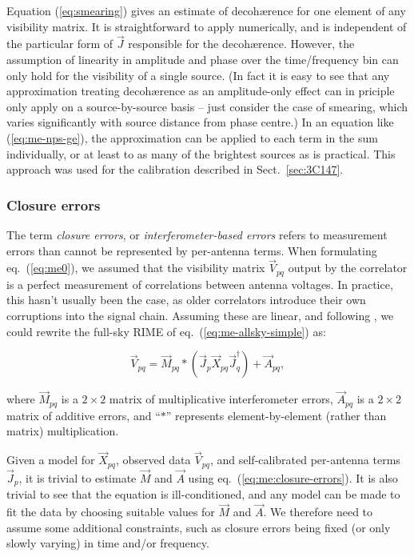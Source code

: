 \documentclass[]{aa}
\begin{document}
Equation (\ref{eq:smearing}) gives an estimate of decoh{\ae}rence for one element of any visibility matrix. It is straightforward to apply numerically, and is independent of the particular form of $\vec J$ responsible for the decoh{\ae}rence. However, the assumption of linearity in amplitude and phase 
over the time/frequency bin can only hold for the visibility of a single source. (In fact it is easy to see that any approximation treating decoh{\ae}rence as an amplitude-only effect can in priciple only apply on a source-by-source basis -- just consider the case of smearing, which varies significantly with source distance from phase centre.) In an equation like (\ref{eq:me-nps-ge}), the approximation can be applied to each term in the sum individually, or at least to as many of the brightest sources as is practical. This approach was used for the calibration described in Sect.~\ref{sec:3C147}.

\subsubsection{\label{sec:closure-errors}Closure errors}

The term {\em closure errors}, or {\em interferometer-based errors} refers to measurement errors than cannot be represented by per-antenna terms. When formulating eq.~(\ref{eq:me0}), we assumed that the visibility matrix $\vec V_{pq}$ output by the correlator is a perfect measurement of correlations between antenna voltages. In practice, this hasn't usually been the case, as older correlators introduce their own corruptions into the signal chain. Assuming these are linear, and following \citet{JEN:note185}, we could rewrite the full-sky RIME of eq.~(\ref{eq:me-allsky-simple}) as: 

    \begin{equation}\label{eq:me:closure-errors}
    \vec V_{pq} = \vec M_{pq} \ast ( \vec J_p \vec X_{pq}  \vec J^\dagger_q ) + \vec A_{pq},
    \end{equation}

where $\vec M_{pq}$ is a $2\times2$ matrix of multiplicative interferometer errors, $\vec A_{pq}$ is a $2\times2$ matrix of additive errors, and ``$\ast$'' represents element-by-element (rather than matrix) multiplication.

Given a model for $\vec X_{pq}$, observed data $\vec V_{pq}$, and self-calibrated per-antenna terms $\vec J_p$, it is trivial to estimate $\vec M$ and $\vec A$ using eq.~(\ref{eq:me:closure-errors}). It is also trivial to see that the equation is ill-conditioned, and any model can be made to fit the data by choosing suitable values for $\vec M$ and $\vec A$. We therefore need to assume some additional constraints, such as closure errors being fixed (or only slowly varying) in time and/or frequency. 
\end{document}
